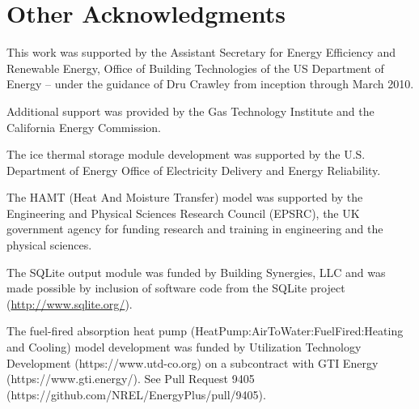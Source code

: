 \section{Other Acknowledgments}\label{other-acknowledgments}

This work was supported by the Assistant Secretary for Energy Efficiency and Renewable Energy, Office of Building Technologies of the US Department of Energy -- under the guidance of Dru Crawley from inception through March 2010.

Additional support was provided by the Gas Technology Institute and the California Energy Commission.

The ice thermal storage module development was supported by the U.S. Department of Energy Office of Electricity Delivery and Energy Reliability.

The HAMT (Heat And Moisture Transfer) model was supported by the Engineering and Physical Sciences Research Council (EPSRC), the UK government agency for funding research and training in engineering and the physical sciences.

The SQLite output module was funded by Building Synergies, LLC and was made possible by inclusion of software code from the SQLite project (\url{http://www.sqlite.org/}).

The fuel-fired absorption heat pump (HeatPump:AirToWater:FuelFired:Heating and Cooling) model development was funded by Utilization Technology Development (https://www.utd-co.org) on a subcontract with GTI Energy (https://www.gti.energy/). See Pull Request 9405 (https://github.com/NREL/EnergyPlus/pull/9405).